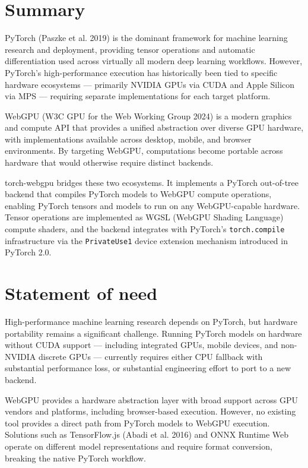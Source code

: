 \section{Summary}\label{summary}

PyTorch (Paszke et al. 2019) is the dominant framework for machine
learning research and deployment, providing tensor operations and
automatic differentiation used across virtually all modern deep learning
workflows. However, PyTorch's high-performance execution has
historically been tied to specific hardware ecosystems --- primarily
NVIDIA GPUs via CUDA and Apple Silicon via MPS --- requiring separate
implementations for each target platform.

WebGPU (W3C GPU for the Web Working Group 2024) is a modern graphics and
compute API that provides a unified abstraction over diverse GPU
hardware, with implementations available across desktop, mobile, and
browser environments. By targeting WebGPU, computations become portable
across hardware that would otherwise require distinct backends.

torch-webgpu bridges these two ecosystems. It implements a PyTorch
out-of-tree backend that compiles PyTorch models to WebGPU compute
operations, enabling PyTorch tensors and models to run on any
WebGPU-capable hardware. Tensor operations are implemented as WGSL
(WebGPU Shading Language) compute shaders, and the backend integrates
with PyTorch's \texttt{torch.compile} infrastructure via the
\texttt{PrivateUse1} device extension mechanism introduced in PyTorch
2.0.

\section{Statement of need}\label{statement-of-need}

High-performance machine learning research depends on PyTorch, but
hardware portability remains a significant challenge. Running PyTorch
models on hardware without CUDA support --- including integrated GPUs,
mobile devices, and non-NVIDIA discrete GPUs --- currently requires
either CPU fallback with substantial performance loss, or substantial
engineering effort to port to a new backend.

WebGPU provides a hardware abstraction layer with broad support across
GPU vendors and platforms, including browser-based execution. However,
no existing tool provides a direct path from PyTorch models to WebGPU
execution. Solutions such as TensorFlow.js (Abadi et al. 2016) and ONNX
Runtime Web operate on different model representations and require
format conversion, breaking the native PyTorch workflow.

